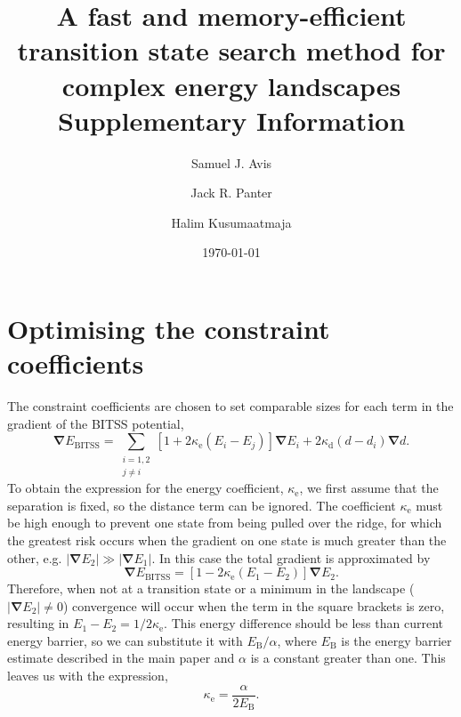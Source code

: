 \documentclass[aip,jcp,11pt]{revtex4-2}
\newcommand{\abs}[1]{\left| #1 \right|}
\newcommand{\grad}{\bm{\nabla}}
\begin{document}
\title{A fast and memory-efficient transition state search method for complex energy landscapes \\ Supplementary Information}
\date{\today}
\author{Samuel J. Avis}
\author{Jack R. Panter}
\author{Halim Kusumaatmaja}
\maketitle

\section{Optimising the constraint coefficients}
The constraint coefficients are chosen to set comparable sizes for each term in the gradient of the BITSS potential,
\begin{equation}
  \grad E_\text{BITSS} = \sum_{\substack{i=1,2 \\ j\neq i}} \left[ 1 + 2 \kappa_\text{e} (E_i - E_j) \right] \grad E_i + 2 \kappa_\text{d} (d - d_i) \grad d.
\end{equation}
To obtain the expression for the energy coefficient, $\kappa_\text{e}$, we first assume that the separation is fixed, so the distance term can be ignored.
The coefficient $\kappa_\text{e}$ must be high enough to prevent one state from being pulled over the ridge, for which the greatest risk occurs when the gradient on one state is much greater than the other, e.g. $\abs{\grad E_2} \gg \abs{\grad E_1}$.
In this case the total gradient is approximated by
\begin{equation}
  \grad E_\text{BITSS} = \left[ 1 - 2 \kappa_\text{e} (E_1 - E_2) \right] \grad E_2.
\end{equation}
Therefore, when not at a transition state or a minimum in the landscape ($\abs{\grad E_2} \neq 0$) convergence will occur when the term in the square brackets is zero, resulting in $E_1 - E_2 = 1 / 2 \kappa_\text{e}$.
This energy difference should be less than current energy barrier, so we can substitute it with $E_\text{B} / \alpha$, where $E_\text{B}$ is the energy barrier estimate described in the main paper and $\alpha$ is a constant greater than one.
This leaves us with the expression,
\begin{equation}
  \kappa_\text{e} = \frac {\alpha} {2 E_\text{B}}.
\end{equation}
\end{document}
